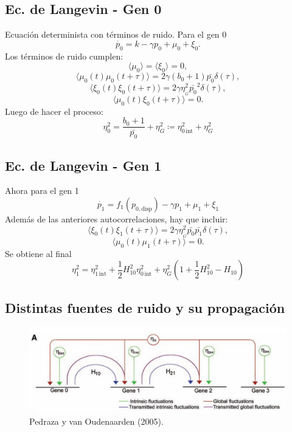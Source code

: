 \documentclass[xcolor=dvipsnames]{beamer}
\begin{document}
\subsection{Ec. de Langevin - Gen 0}
\begin{frame}
Ecuaci\'on determinista con t\'erminos de ruido. Para el gen 0
$$\dot{p_0} = k - \gamma p_0 + \mu_0 + \xi_{0}.$$
Los t\'erminos de ruido cumplen:
$$\langle \mu_0 \rangle = \langle \xi_0 \rangle = 0,$$
$$\langle \mu_0(t)\mu_0(t+\tau) \rangle  = 2\gamma (b_0+1) \bar{p_0} \delta(\tau),$$
$$\langle \xi_0(t)\xi_0(t+\tau) \rangle = 2 \gamma \eta_{_G}^2\bar{p_0}^2 \delta(\tau),$$
$$\langle \mu_0(t)\xi_0(t+\tau) \rangle = 0.$$
Luego de hacer el proceso:
$$\eta_0^2=\frac{b_0+1}{\bar{p_0}} + \eta_{G}^2\coloneqq\eta_{0\,\text{int}}^2+\eta_{G}^2$$
\end{frame}

\subsection{Ec. de Langevin - Gen 1}
\begin{frame}
Ahora para el gen 1
$$\dot{p_1} = f_1(p_{0,\text{disp}}) - \gamma p_1 + \mu_1 + \xi_1$$
Adem\'as de las anteriores autocorrelaciones, hay que incluir:
$$\langle \xi_0(t)\xi_1(t+\tau) \rangle = 2 \gamma \eta_{_G}^2\bar{p_0}\bar{p_1}\delta(\tau),$$
$$\langle \mu_0(t)\mu_1(t+\tau) \rangle =0.$$
Se obtiene al final
$$\eta_1^2 = \eta_{1\,\text{int}}^2 + \frac{1}{2} H_{10}^2 \eta_{0\,\text{int}}^2 + \eta_G^2\left( 1 + \frac{1}{2} H_{10}^2 - H_{10} \right)$$
\end{frame}

\subsection{Distintas fuentes de ruido y su propagaci\'on}
\begin{frame}
\begin{figure}[p]
    \centering
    \includegraphics[width=\textwidth]{globalint.png}\\
    \tiny Pedraza y van Oudenaarden (2005).
\end{figure}
\end{frame}
\end{document}
